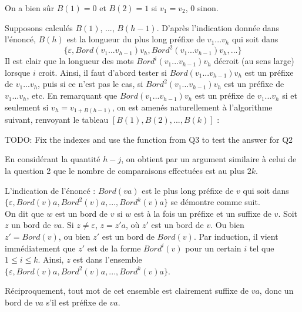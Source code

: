 \Q
On a bien sûr $B(1)=0$ et $B(2)=1$ si $v_1=v_2$, 0 sinon.
\smallskip

Supposons calculés $B(1)$, ..., $B(h-1)$. D'après l'indication donnée dans l'énoncé, $B(h)$ est la longueur du plus long préfixe de $v_1...v_h$ qui soit dans
\[
    \{\varepsilon, Bord(v_1...v_{h-1})v_h,Bord^2(v_1...v_{h-1})v_h, ...\}
\]
Il est clair que la longueur des mots $Bord^i(v_1...v_{h-1})v_h$ décroit (au sens large) lorsque $i$ croit. Ainsi, il faut d'abord tester si $Bord(v_1...v_{h-1})v_h$ est un préfixe de $v_1...v_h$, puis si ce n'est pas le cas, si $Bord^2(v_1...v_{h-1})v_h$ est un préfixe de $v_1...v_h$, etc. En remarquant que $Bord(v_1...v_{h-1})v_h$ est un préfixe de $v_1...v_h$ si et seulement si $v_h=v_{1+B(h-1)}$, on est amenés naturellement à l'algorithme suivant, renvoyant le tableau $[B(1), B(2), ..., B(k)]$ :

TODO: Fix the indexes and use the function from Q3 to test the answer for Q2


En considérant la quantité $h-j$, on obtient par un argument similaire à celui de la question 2 que le nombre de comparaisons effectuées est au plus $2k$.
\bigskip

L'indication de l'énoncé : $Bord(va)$ est le plus long préfixe de $v$ qui soit dans \newline $\{\varepsilon, Bord(v)a,Bord^2(v)a, ..., Bord^k(v)a\}$ se démontre comme suit.\\
On dit que $w$ est un bord de $v$ si $w$ est à la fois un préfixe et un suffixe de $v$. Soit $z$ un bord de $va$. Si $z \neq \varepsilon$, $z = z'a$, où $z'$ est un bord de $v$. Ou bien $z'=Bord(v)$, ou bien $z'$ est un bord de $Bord(v)$. Par induction, il vient immédiatement que $z'$ est de la forme $Bord^i(v)$ pour un certain $i$ tel que $1 \leq i \leq k$. Ainsi, $z$ est dans l'ensemble $\{\varepsilon, Bord(v)a,Bord^2(v)a, ..., Bord^k(v)a\}$.
\smallskip

Réciproquement, tout mot de cet ensemble est clairement suffixe de $va$, donc un bord de $va$ s'il est préfixe de $va$.
\bigskip

\Fin
